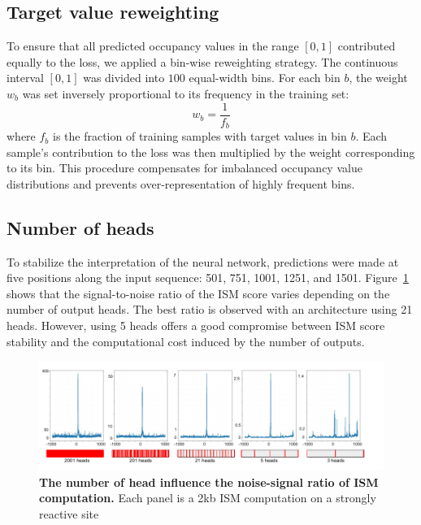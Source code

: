 \documentclass[11pt]{book}
\begin{document}
\subsection{Target value reweighting}
To ensure that all predicted occupancy values in the range $[0,1]$ contributed equally to the loss, we applied a bin-wise reweighting strategy. The continuous interval $[0,1]$ was divided into $100$ equal-width bins. For each bin $b$, the weight $w_b$ was set inversely proportional to its frequency in the training set:
\begin{equation}
    w_b = \frac{1}{f_b}
\end{equation}
where $f_b$ is the fraction of training samples with target values in bin $b$. Each sample's contribution to the loss was then multiplied by the weight corresponding to its bin. This procedure compensates for imbalanced occupancy value distributions and prevents over-representation of highly frequent bins.

\subsection{Number of heads}
To stabilize the interpretation of the neural network, predictions were made at five positions along the input sequence: 501, 751, 1001, 1251, and 1501.
Figure~\ref{fig:nbhead_mut} shows that the signal-to-noise ratio of the ISM score varies depending on the number of output heads.
The best ratio is observed with an architecture using 21 heads.
However, using 5 heads offers a good compromise between ISM score stability and the computational cost induced by the number of outputs.

\begin{figure}[htbp]
    \centering
    \includegraphics[width=\textwidth]{Figures/Results/mutasome_nb_heads.pdf}
    \caption{\textbf{The number of head influence the noise-signal ratio of ISM computation.} Each panel is a 2kb ISM computation on a strongly reactive site}

    \label{fig:nbhead_mut}
\end{figure}
\end{document}
